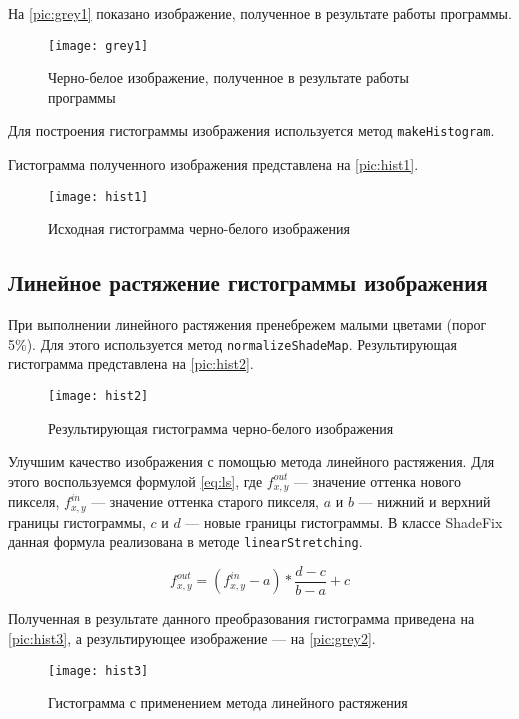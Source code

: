 На \vref{pic:grey1} показано изображение, полученное в результате работы программы.

\begin{figure}[H]
	\centering
	\texttt{[image: grey1]}
	\caption{Черно-белое изображение, полученное в результате работы программы}
	\label{pic:grey1}
\end{figure}

Для построения гистограммы изображения используется метод \texttt{makeHistogram}.

Гистограмма полученного изображения представлена на \vref{pic:hist1}.

\begin{figure}[H]
	\centering
	\texttt{[image: hist1]}
	\caption{Исходная гистограмма черно-белого изображения}
	\label{pic:hist1}
\end{figure}

\subsection{Линейное растяжение гистограммы изображения}

При выполнении линейного растяжения пренебрежем малыми цветами (порог 5\%). Для этого используется метод \texttt{normalizeShadeMap}. Результирующая гистограмма представлена на \vref{pic:hist2}.

\begin{figure}[H]
	\centering
	\texttt{[image: hist2]}
	\caption{Результирующая гистограмма черно-белого изображения}
	\label{pic:hist2}
\end{figure}

Улучшим качество изображения с помощью метода линейного растяжения. Для этого воспользуемся формулой \vref{eq:ls}, где $f_{x,y}^{out}$ --- значение оттенка нового пикселя, $f_{x,y}^{in}$ --- значение оттенка старого пикселя, $a$ и $b$ --- нижний и верхний границы гистограммы, $c$ и $d$ --- новые границы гистограммы. В классе ShadeFix данная формула реализована в методе \texttt{linearStretching}.

\begin{equation} \label{eq:ls}
	f_{x,y}^{out}=(f_{x,y}^{in}-a)*\frac{d-c}{b-a}+c
\end{equation}

Полученная в результате данного преобразования гистограмма приведена на \vref{pic:hist3}, а результирующее изображение --- на \vref{pic:grey2}.

\begin{figure}[H]
	\centering
	\texttt{[image: hist3]}
	\caption{Гистограмма с применением метода линейного растяжения}
	\label{pic:hist3}
\end{figure}

